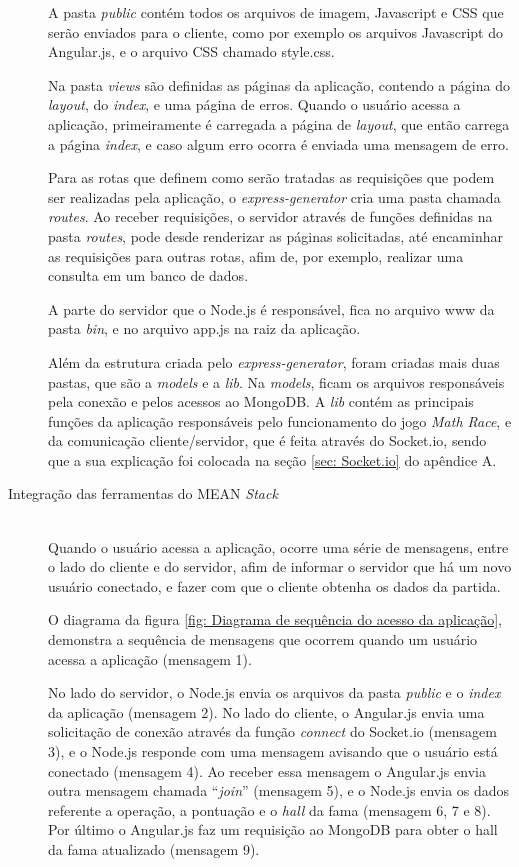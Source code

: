 \begin{description}
A pasta \textit{public} contém todos os arquivos de imagem, Javascript e CSS que serão enviados para o cliente, como por exemplo os arquivos Javascript do Angular.js, e o arquivo CSS chamado style.css.

Na pasta \textit{views} são definidas as páginas da aplicação, contendo a página do \textit{layout}, do \textit{index}, e uma página de erros. Quando o usuário acessa a aplicação, primeiramente é carregada a página de \textit{layout}, que então carrega a página \textit{index}, e caso algum erro ocorra é enviada uma mensagem de erro.

Para as rotas que definem como serão tratadas as requisições que podem ser realizadas pela aplicação, o \textit{express-generator} cria uma pasta chamada \textit{routes}. Ao receber requisições, o servidor através de funções definidas na pasta \textit{routes}, pode desde renderizar as páginas solicitadas, até encaminhar as requisições para outras rotas, afim de, por exemplo, realizar uma consulta em um banco de dados.

A parte do servidor que o Node.js é responsável, fica no arquivo www da pasta \textit{bin}, e no arquivo app.js na raiz da aplicação.  

Além da estrutura criada pelo \textit{express-generator}, foram criadas mais duas pastas, que são a \textit{models} e a \textit{lib}. Na \textit{models}, ficam os arquivos responsáveis pela conexão e pelos acessos ao MongoDB. A \textit{lib} contém as principais funções da aplicação responsáveis pelo funcionamento do jogo \textit{Math Race}, e da comunicação cliente/servidor, que é feita através do Socket.io, sendo que a sua explicação foi colocada na seção \ref{sec: Socket.io} do apêndice A.

\item[Integração das ferramentas do MEAN \textit{Stack}] \hfill \\
Quando o usuário acessa a aplicação, ocorre uma série de mensagens, entre o lado do cliente e do servidor, afim de informar o servidor que há um novo usuário conectado, e fazer com que o cliente obtenha os dados da partida. 

O diagrama da figura \ref{fig: Diagrama de sequência do acesso da aplicação}, demonstra a sequência de mensagens que ocorrem quando um usuário acessa a aplicação (mensagem 1). 

No lado do servidor, o Node.js envia os arquivos da pasta \textit{public} e o \textit{index} da aplicação (mensagem 2). No lado do cliente, o Angular.js envia uma solicitação de conexão através da função \textit{connect} do Socket.io (mensagem 3), e o Node.js responde com uma mensagem avisando que o usuário está conectado (mensagem 4). Ao receber essa mensagem o Angular.js envia outra mensagem chamada ``\textit{join}'' (mensagem 5), e o Node.js envia os dados referente a operação, a pontuação e o \textit{hall} da fama (mensagem 6, 7 e 8). Por último o Angular.js faz um requisição ao MongoDB para obter o hall da fama atualizado (mensagem 9). 


\end{description}
